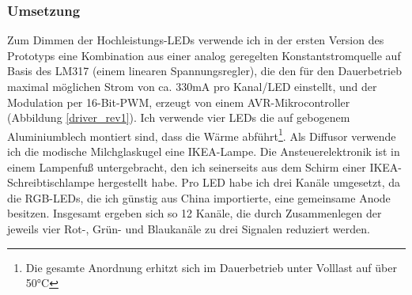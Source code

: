 \documentclass[12pt,a4paper,notitlepage]{article}
\begin{document}
\subsubsection{Umsetzung}
Zum Dimmen der Hochleistungs-LEDs verwende ich in der ersten Version des Prototyps eine Kombination aus einer analog geregelten Konstantstromquelle auf Basis des LM317\cite{NATIONAL3} (einem linearen Spannungsregler), die den für den Dauerbetrieb maximal möglichen Strom von ca. 330mA pro Kanal/LED einstellt, und der Modulation per 16-Bit-PWM, erzeugt von einem AVR-Mikrocontroller (Abbildung \ref{driver_rev1}).
Ich verwende vier LEDs die auf gebogenem Aluminiumblech montiert sind, dass die Wärme abführt\footnote{Die gesamte Anordnung erhitzt sich im Dauerbetrieb unter Volllast auf über 50°C}. Als Diffusor verwende ich die modische Milchglaskugel eine IKEA-Lampe. Die Ansteuerelektronik ist in einem Lampenfuß untergebracht, den ich seinerseits aus dem Schirm einer IKEA-Schreibtischlampe hergestellt habe. Pro LED habe ich drei Kanäle umgesetzt, da die RGB-LEDs, die ich günstig aus China importierte, %
eine gemeinsame Anode besitzen. Insgesamt ergeben sich so 12 Kanäle, die durch Zusammenlegen der jeweils vier Rot-, Grün- und Blaukanäle zu drei Signalen reduziert werden.
\end{document}

